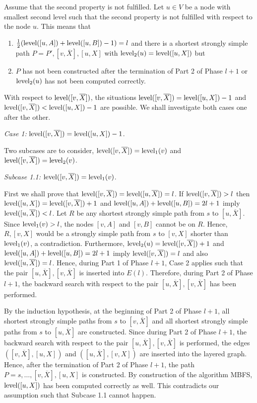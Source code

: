 \documentclass[12pt,twoside,a4paper]{article}
\def\lev{{\rm level}}
\begin{document}
\medskip
Assume that the second property is not fulfilled. Let $u \in V$ be a node with smallest second
level such that the second property is not fulfilled with respect to the node $u$. This means 
that
\begin{enumerate}
\item
$\frac{1}{2}(\lev([u,A]) + \lev([u,B]) - 1) = l$ and there is a shortest strongly simple path 
$P = P',[v,\overline{X}],[u,X]$ with $\lev_2(u) = \lev([u,X])$ but 
\item
$P$ has not been constructed after the termination of Part 2 of Phase $l+1$ or 
$\lev_2(u)$ has not been computed correctly. 
\end{enumerate}
With respect to $\lev([v,\overline{X}])$, the situations $\lev([v,\overline{X}]) = 
\lev([u,X]) - 1$ and $\lev([v,\overline{X}]) < \lev([u,X]) - 1$ are possible. We shall investigate 
both cases one after the other.

\medskip
\noindent
{\em Case 1:} $\lev([v,\overline{X}]) = \lev([u,X]) - 1$.

\medskip
Two subcases are to consider, $\lev([v,\overline{X}]) = \lev_1(v)$ and
$\lev([v,\overline{X}]) = \lev_2(v)$.

\medskip
\noindent
{\em Subcase 1.1:} $\lev([v,\overline{X}]) = \lev_1(v)$.

\medskip
First we shall prove that $\lev([v,\overline{X}]) = \lev([u,\overline{X}]) = l$. 
If $\lev([v,\overline{X}]) > l$ then $\lev([u,X]) = \lev([v,\overline{X}]) + 1$ and
$\lev([u,A]) + \lev([u,B]) = 2l+1$ imply $\lev([u,\overline{X}]) < l$.
Let $R$ be any shortest strongly simple path from $s$ to
$[u,\overline{X}]$. Since $\lev_1(v) > l$, the nodes $[v,A]$ and $[v,B]$ cannot be on $R$. 
Hence, $R,[v,X]$ would be a strongly simple path from $s$ to $[v,X]$ shorter than 
$\lev_1(v)$, a contradiction. Furthermore, $\lev_2(u) = \lev([v,\overline{X}]) + 1$ and
$\lev([u,A]) + \lev([u,B]) = 2l+1$ imply $\lev([v,\overline{X}]) = l$ and also
$\lev([u,\overline{X}]) = l$. Hence, during Part 1 of Phase $l+1$, Case 2 applies such
that the pair $[u,\overline{X}],[v,\overline{X}]$ is inserted into $E(l)$. Therefore,
during Part 2 of Phase $l+1$, the backward search with respect to the pair 
$[u,\overline{X}],[v,\overline{X}]$ has been performed.

By the induction hypothesis, at the beginning of Part 2 of Phase $l+1$, all shortest strongly
simple paths from $s$ to $[v,\overline{X}]$ and all shortest strongly simple paths from $s$
to $[u,\overline{X}]$ are constructed. Since during Part 2 of Phase $l+1$, the backward search with 
respect to the pair $[u,\overline{X}],[v,\overline{X}]$ is performed, the edges
$([v,\overline{X}],[u,X])$ and $([u,\overline{X}],[v,X])$ are inserted into the layered graph. 
Hence, after the termination of Part 2 of Phase $l+1$, the path 
$P = s, \ldots,[v,\overline{X}],[u,X]$ is constructed. By construction of the algorithm MBFS,
$\lev([u,X])$ has been computed correctly as well. This contradicts our assumption such that
Subcase 1.1 cannot happen.
\end{document}
